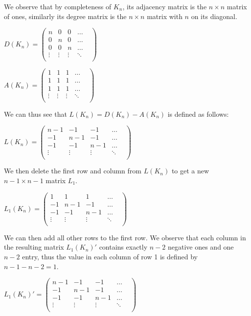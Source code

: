 \documentclass[
]{article}
\begin{document}
We observe that by completeness of \(K_n\), its adjacency matrix is the
\(n \times n\) matrix of ones, similarly its degree matrix is the
\(n \times n\) matrix with \(n\) on its diagonal.

\(D(K_n) = \begin{pmatrix}  n & 0 & 0 & \dots \\  0 & n & 0 &\dots \\  0 & 0 & n &\dots \\  \vdots & \vdots & \vdots & \ddots & \\  \end{pmatrix}\)

\(A(K_n) = \begin{pmatrix}  1 & 1 & 1 & \dots \\  1 & 1 & 1 &\dots \\  1 & 1 & 1 &\dots \\  \vdots & \vdots & \vdots & \ddots & \\  \end{pmatrix}\)

We can thus see that \(L(K_n) = D(K_n) - A(K_n)\) is defined as follows:

\(L(K_n) = \begin{pmatrix}  n-1 & -1 & -1 & \dots \\  -1 & n-1 & -1 &\dots \\  -1 & -1 & n-1 &\dots \\  \vdots & \vdots & \vdots & \ddots & \\  \end{pmatrix}\)

We then delete the first row and column from \(L(K_n)\) to get a new
\(n-1 \times n-1\) matrix \(L_1\).

\(L_1(K_n) = \begin{pmatrix}  1 & 1 & 1 & \dots \\  -1 & n-1 & -1 &\dots \\  -1 & -1 & n-1 &\dots \\  \vdots & \vdots & \vdots & \ddots & \\  \end{pmatrix}\)

We can then add all other rows to the first row. We observe that each
column in the resulting matrix \(L_1(K_n)'\) contains exactly \(n-2\)
negative ones and one \(n-2\) entry, thus the value in each column of
row 1 is defined by \(n-1-n-2 = 1\).

\(L_1(K_n)' = \begin{pmatrix}  n-1 & -1 & -1 & \dots \\  -1 & n-1 & -1 &\dots \\  -1 & -1 & n-1 &\dots \\  \vdots & \vdots & \vdots & \ddots & \\  \end{pmatrix}\)
\end{document}

